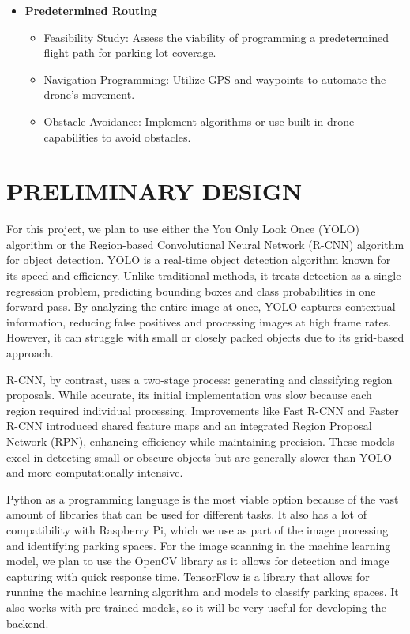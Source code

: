 \documentclass[conference]{IEEEtran}
\begin{document}
\begin{itemize}
\begin{itemize}
    \end{itemize}
    \item \textbf{Predetermined Routing}
    \begin{itemize}
        \item Feasibility Study: Assess the viability of programming a predetermined flight path for parking lot coverage.
        \item Navigation Programming: Utilize GPS and waypoints to automate the drone’s movement.
        \item Obstacle Avoidance: Implement algorithms or use built-in drone capabilities to avoid obstacles.
    \end{itemize}
\end{itemize}


\section{PRELIMINARY DESIGN}


For this project, 
we plan to use either the You Only Look Once 
(YOLO) 
algorithm or the Region-based Convolutional Neural Network 
(R-CNN) 
algorithm for object detection. 
YOLO is a real-time object detection algorithm known for its speed and efficiency. 
Unlike traditional methods, 
it treats detection as a single regression problem, 
predicting bounding boxes and class probabilities in one forward pass. 
By analyzing the entire image at once, 
YOLO captures contextual information, 
reducing false positives and processing images at high frame rates. 
However, 
it can struggle with small or closely packed objects due to its grid-based approach.

R-CNN, by contrast, uses a two-stage process: 
generating and classifying region proposals. 
While accurate, 
its initial implementation was slow because each region required individual processing. 
Improvements like Fast R-CNN and Faster R-CNN introduced shared feature maps and an integrated Region Proposal Network (RPN), 
enhancing efficiency while maintaining precision. 
These models excel in detecting small or obscure objects but are generally slower than YOLO and more computationally intensive.

Python as a programming language is the most viable option because of the vast amount of libraries that can be used for different tasks. 
It also has a lot of compatibility with Raspberry Pi, 
which we use as part of the image processing and identifying parking spaces. 
For the image scanning in the machine learning model, 
we plan to use the OpenCV library as it allows for detection and image capturing with quick response time. 
TensorFlow is a library that allows for running the machine learning algorithm and models to classify parking spaces. 
It also works with pre-trained models, 
so it will be very useful for developing the backend.
\end{document}
